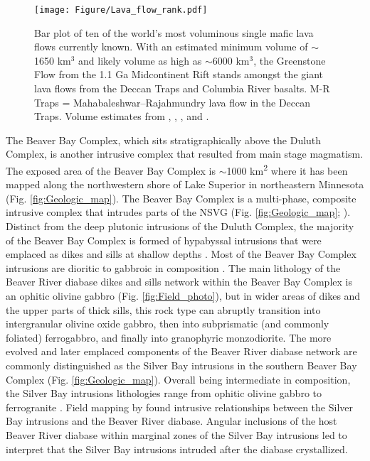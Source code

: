 \begin{figure}[h!]
\noindent\texttt{[image: Figure/Lava\_flow\_rank.pdf]}
\caption{\footnotesize{Bar plot of ten of the world's most voluminous single mafic lava flows currently known. With an estimated minimum volume of $\sim$1650 km$^3$ and likely volume as high as $\sim$6000 km$^3$, the Greenstone Flow from the 1.1 Ga Midcontinent Rift stands amongst the giant lava flows from the Deccan Traps and Columbia River basalts. M-R Traps = Mahabaleshwar–Rajahmundry lava flow in the Deccan Traps. Volume estimates from , , , and .}}
\label{fig:lava_flow_rank}
\end{figure}

The Beaver Bay Complex, which sits stratigraphically above the Duluth Complex, is another intrusive complex that resulted from main stage magmatism. The exposed area of the Beaver Bay Complex is $\sim$1000 km\textsuperscript{2} where it has been mapped along the northwestern shore of Lake Superior in northeastern Minnesota (Fig. \ref{fig:Geologic_map}). The Beaver Bay Complex is a multi-phase, composite intrusive complex that intrudes parts of the NSVG (Fig. \ref{fig:Geologic_map}; ). Distinct from the deep plutonic intrusions of the Duluth Complex, the majority of the Beaver Bay Complex is formed of hypabyssal intrusions that were emplaced as dikes and sills at shallow depths \cite{Miller1997a}. Most of the Beaver Bay Complex intrusions are dioritic to gabbroic in composition \cite{Miller1997a}. The main lithology of the Beaver River diabase dikes and sills network within the Beaver Bay Complex is an ophitic olivine gabbro (Fig. \ref{fig:Field_photo}), but in wider areas of dikes and the upper parts of thick sills, this rock type can abruptly transition into intergranular olivine oxide gabbro, then into subprismatic (and commonly foliated) ferrogabbro, and finally into granophyric monzodiorite. The more evolved and later emplaced components of the Beaver River diabase network are commonly distinguished as the Silver Bay intrusions in the southern Beaver Bay Complex (Fig. \ref{fig:Geologic_map}). Overall being intermediate in composition, the Silver Bay intrusions lithologies range from ophitic olivine gabbro to ferrogranite \cite{Shank1989a}. Field mapping by  found intrusive relationships between the Silver Bay intrusions and the Beaver River diabase. Angular inclusions of the host Beaver River diabase within marginal zones of the Silver Bay intrusions led  to interpret that the Silver Bay intrusions intruded after the diabase crystallized.

